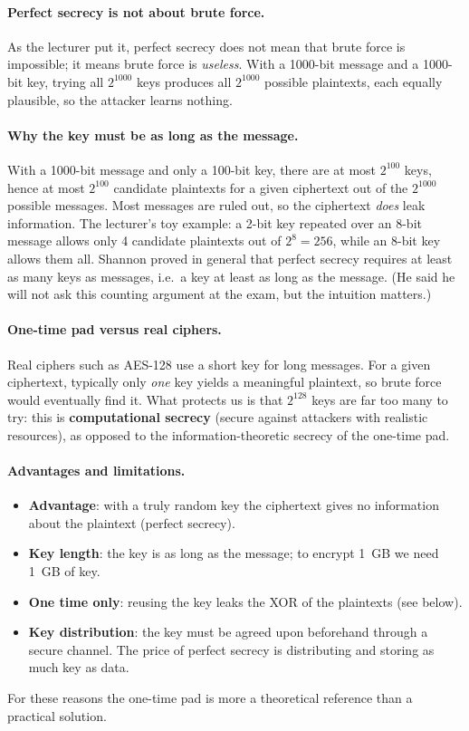 \paragraph{Perfect secrecy is not about brute force.} As the lecturer put it, perfect secrecy does not mean that brute force is impossible; it means brute force is \emph{useless}. With a 1000-bit message and a 1000-bit key, trying all $2^{1000}$ keys produces all $2^{1000}$ possible plaintexts, each equally plausible, so the attacker learns nothing.

\paragraph{Why the key must be as long as the message.} With a 1000-bit message and only a 100-bit key, there are at most $2^{100}$ keys, hence at most $2^{100}$ candidate plaintexts for a given ciphertext out of the $2^{1000}$ possible messages. Most messages are ruled out, so the ciphertext \emph{does} leak information. The lecturer's toy example: a 2-bit key repeated over an 8-bit message allows only 4 candidate plaintexts out of $2^8 = 256$, while an 8-bit key allows them all. Shannon proved in general that perfect secrecy requires at least as many keys as messages, i.e.\ a key at least as long as the message. (He said he will not ask this counting argument at the exam, but the intuition matters.)

\paragraph{One-time pad versus real ciphers.} Real ciphers such as AES-128 use a short key for long messages. For a given ciphertext, typically only \emph{one} key yields a meaningful plaintext, so brute force would eventually find it. What protects us is that $2^{128}$ keys are far too many to try: this is \textbf{computational secrecy} (secure against attackers with realistic resources), as opposed to the information-theoretic secrecy of the one-time pad.

\paragraph{Advantages and limitations.}
\begin{itemize}
    \item \textbf{Advantage}: with a truly random key the ciphertext gives no information about the plaintext (perfect secrecy).
    \item \textbf{Key length}: the key is as long as the message; to encrypt 1~GB we need 1~GB of key.
    \item \textbf{One time only}: reusing the key leaks the XOR of the plaintexts (see below).
    \item \textbf{Key distribution}: the key must be agreed upon beforehand through a secure channel. The price of perfect secrecy is distributing and storing as much key as data.
\end{itemize}
For these reasons the one-time pad is more a theoretical reference than a practical solution.

